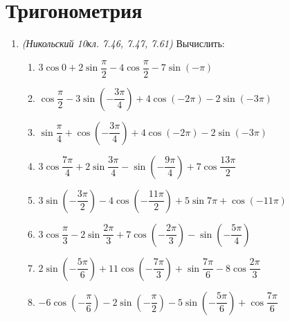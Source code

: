 \section{Тригонометрия}
\begin{enumerate}
	\item \textit{(Никольский 10кл. 7.46, 7.47, 7.61)} Вычислить:
	\begin{enumerate}[label=\asbuk*)]
		\item $3\cos0+2\sin\dfrac{\pi}{2}-4\cos\dfrac{\pi}{2}-7\sin(-\pi)$
		\item $\cos\dfrac{\pi}{2}-3\sin\left(-\dfrac{3\pi}{4}\right)+4\cos(-2\pi)-2\sin(-3\pi)$
		\item $\sin\dfrac{\pi}{4}+\cos\left(-\dfrac{3\pi}{4}\right)+4\cos(-2\pi)-2\sin(-3\pi)$
		\item $3\cos\dfrac{7\pi}{4}+2\sin\dfrac{3\pi}{4}-\sin\left(-\dfrac{9\pi}{4}\right)+7\cos\dfrac{13\pi}{2}$
		\item $3\sin\left(-\dfrac{3\pi}{2}\right)-4\cos\left(-\dfrac{11\pi}{2}\right)+5\sin7\pi+\cos(-11\pi)$
		\item $3\cos\dfrac{\pi}{3}-2\sin\dfrac{2\pi}{3}+7\cos\left(-\dfrac{2\pi}{3}\right)-\sin\left(-\dfrac{5\pi}{4}\right)$
		\item $2\sin\left(-\dfrac{5\pi}{6}\right)+11\cos\left(-\dfrac{7\pi}{3}\right)+\sin\dfrac{7\pi}{6}-8\cos\dfrac{2\pi}{3}$
		\item $-6\cos\left(-\dfrac{\pi}{6}\right)-2\sin\left(-\dfrac{\pi}{2}\right)-5\sin\left(-\dfrac{5\pi}{6}\right)+\cos\dfrac{7\pi}{6}$
	\end{enumerate}
\end{enumerate}